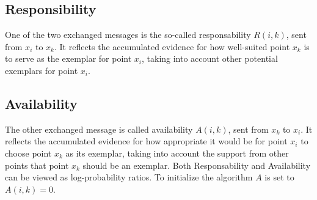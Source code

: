 \documentclass[11pt,a4paper]{article}
\begin{document}
\subsection{Responsibility}
One of the two exchanged messages is the so-called responsability $R(i,k)$, sent from $x_i$ to $x_k$. It reflects the accumulated evidence for how well-suited point $x_k$ is to serve as the exemplar for point $x_i$, taking into account other potential exemplars for point $x_i$.\cite{frey2007clustering}
\subsection{Availability}
The other exchanged message is called availability $A(i,k)$, sent from $x_k$ to $x_i$. It reflects the accumulated evidence for how appropriate it would be for point $x_i$ to choose point $x_k$ as its exemplar, taking into account the support from other points that point $x_k$ should be an exemplar. Both Responsability and Availability can be viewed as log-probability ratios. To initialize the algorithm $A$ is set to $A(i,k) = 0$.\cite{frey2007clustering}
\pagebreak
\end{document}
